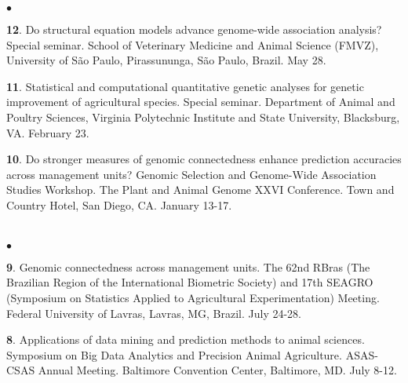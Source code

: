 \documentclass[margin,line,10pt]{res}
\newenvironment{list2}{
  \begin{list}{$\bullet$}{%
      \setlength{\itemsep}{0in}
      \setlength{\parsep}{0in} \setlength{\parskip}{0in}
      \setlength{\topsep}{0in} \setlength{\partopsep}{0in} 
      \setlength{\leftmargin}{0.2in}}}{\end{list}}
\begin{document}
\begin{resume}
\begin{list2}
  \vspace{0.5cm}
  
  
\item [{\bf 12}.] Do structural equation models advance genome-wide association analysis? Special seminar. School of Veterinary Medicine and Animal Science (FMVZ), University of S\~{a}o Paulo, Pirassununga, S\~{a}o Paulo, Brazil.  May 28.

    \vspace{0.5cm}
    
\item [{\bf 11}.]  Statistical and computational quantitative genetic analyses for genetic improvement of agricultural species. Special seminar.  Department of Animal and Poultry Sciences, Virginia Polytechnic Institute and State University, Blacksburg, VA. February 23.

  \vspace{0.5cm}
  
\item [{\bf 10}.] Do stronger measures of genomic connectedness enhance prediction accuracies across management units?  Genomic Selection and Genome-Wide Association Studies Workshop. The Plant and Animal Genome XXVI Conference. Town and Country Hotel, San Diego, CA. January 13-17. 
  
\end{list2}


\section{}
\begin{list2}
\item [{\bf 9}.] Genomic connectedness across management units. The 62nd RBras (The Brazilian Region of the International Biometric Society) and 17th SEAGRO (Symposium on Statistics Applied to Agricultural Experimentation) Meeting. Federal University of Lavras, Lavras, MG, Brazil. July 24-28. 
  
  \vspace{0.5cm}
  
  \item [{\bf 8}.] Applications of data mining and prediction methods to animal sciences. Symposium on Big Data Analytics and Precision Animal Agriculture. ASAS-CSAS Annual Meeting. Baltimore Convention Center, Baltimore, MD. July 8-12. 
  
\end{list2}




\end{resume}
\end{document}
